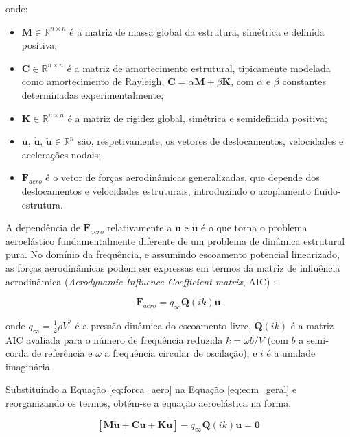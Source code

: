 \documentclass[a4paper,fleqn]{cas-sc}
\begin{document}
\noindent onde:
\begin{itemize}
    \item $\mathbf{M} \in \mathbb{R}^{n \times n}$ é a matriz de massa global da estrutura, simétrica e definida positiva;
    \item $\mathbf{C} \in \mathbb{R}^{n \times n}$ é a matriz de amortecimento estrutural, tipicamente modelada como amortecimento de Rayleigh, $\mathbf{C} = \alpha \mathbf{M} + \beta \mathbf{K}$, com $\alpha$ e $\beta$ constantes determinadas experimentalmente;
    \item $\mathbf{K} \in \mathbb{R}^{n \times n}$ é a matriz de rigidez global, simétrica e semidefinida positiva;
    \item $\mathbf{u}$, $\dot{\mathbf{u}}$, $\ddot{\mathbf{u}} \in 
    \mathbb{R}^{n}$ são, respetivamente, os vetores de deslocamentos, velocidades e acelerações nodais;
    \item $\mathbf{F}_{aero}$ é o vetor de forças aerodinâmicas generalizadas, que depende dos deslocamentos e velocidades estruturais, introduzindo o acoplamento fluido-estrutura.
\end{itemize}

A dependência de $\mathbf{F}_{aero}$ relativamente a $\mathbf{u}$ e $\dot{\mathbf{u}}$ é o que torna o problema aeroelástico fundamentalmente diferente de um problema de dinâmica estrutural pura. No domínio da frequência, e assumindo escoamento potencial linearizado, as forças aerodinâmicas podem ser expressas em termos da matriz de influência aerodinâmica (\textit{Aerodynamic Influence Coefficient matrix}, AIC) \cite{Roger1977}:

\begin{equation}
    \mathbf{F}_{aero} = q_\infty \mathbf{Q}(ik) \mathbf{u}
    \label{eq:forca_aero}
\end{equation}

\noindent onde $q_\infty = \frac{1}{2}\rho V^2$ é a pressão dinâmica do escoamento livre, $\mathbf{Q}(ik)$ é a matriz AIC avaliada para o número de frequência reduzida $k = \omega b / V$ (com $b$ a semi-corda de referência e $\omega$ a frequência circular de oscilação), e $i$ é a unidade imaginária.

Substituindo a Equação \eqref{eq:forca_aero} na Equação \eqref{eq:eom_geral} e reorganizando os termos, obtém-se a equação aeroelástica na forma:

\begin{equation}
    \left[ \mathbf{M}\ddot{\mathbf{u}} + \mathbf{C}\dot{\mathbf{u}} + 
    \mathbf{K}\mathbf{u} \right] - q_\infty \mathbf{Q}(ik)\mathbf{u} 
    = \mathbf{0}
    \label{eq:flutter_eq}
\end{equation}
\end{document}
